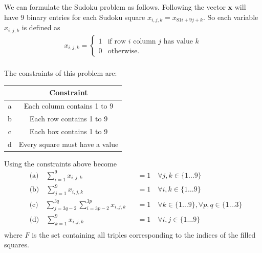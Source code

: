 \documentclass{article}
\begin{document}
\hspace{92pt}\begin{lpsudoku}[scale=0.5]
\end{lpsudoku}\\
\\

\noindent We can formulate the Sudoku problem as follows. Following \cite[p.~1]{mücke2024sudoku} the vector \(\mathbf{x}\) will have 9 binary entries for each Sudoku square \(x_{i,j,k} = x_{81i + 9j + k}\). So each variable \(x_{i,j,k}\) is defined as
\begin{align*}
    x_{i,j,k} = \begin{cases}
        1 & \text{if row \(i\) column \(j\) has value \(k\)} \\
        0 & \text{otherwise.}
    \end{cases}
\end{align*}\\

\noindent The constraints of this problem are:
\begin{center}
\begin{tabular}{ |c|c| } 
 \hline
   & Constraint\\ 
 \hline
 a & Each column contains 1 to 9\\ 
 b & Each row contains 1 to 9\\
 c & Each box contains 1 to 9\\
 d & Every square must have a value\\
 \hline
\end{tabular}
\end{center}

\noindent Using \cite[p.~326]{ILPsudoku} the constraints above become
\begin{align*}
&\text{(a)} \quad \sum_{i=1}^9 x_{i,j,k} &&= 1\quad \forall j,k \in \{1 \dots 9\} \\
&\text{(b)} \quad \sum_{j=1}^9 x_{i,j,k} &&= 1\quad \forall i,k \in \{1 \dots 9\} \\
&\text{(c)} \quad \sum_{j=3q-2}^{3q} \sum_{i=3p-2}^{3p} x_{i,j,k} &&= 1\quad \forall k \in \{1 \dots 9\}, \forall p,q \in \{1 \dots 3\}\\
&\text{(d)} \quad \sum_{k=1}^9 x_{i,j,k} &&= 1\quad \forall i,j \in \{1 \dots 9\} \\
\end{align*}
where \(F\) is the set containing all triples corresponding to the indices of the filled squares. \\
\end{document}
